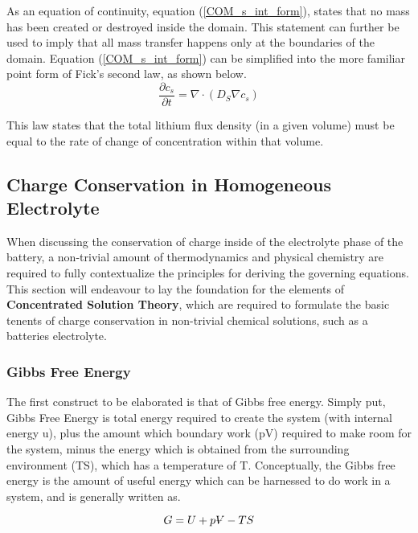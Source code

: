\documentclass[lettersize,journal]{IEEEtran}
\newcommand{\volume}{{\ooalign{\hfil$V$\hfil\cr\kern0.08em--\hfil\cr}}}
\begin{document}
 As an equation of continuity, equation (\ref{COM_s_int_form}), states that no mass has been created or destroyed inside the domain. This statement can further be used to imply that all mass transfer happens only at the boundaries of the domain. Equation (\ref{COM_s_int_form}) can be simplified into the more familiar point form of Fick's second law, as shown below.
\begin{equation}
    \frac{\partial c_{s}}{\partial t} = \nabla \cdot \left( D_{S} \nabla c_{s} \right)
\end{equation}

This law states that the total lithium flux density (in a given volume) must be equal to the rate of change of concentration within that volume.


\subsection{Charge Conservation in Homogeneous Electrolyte}

When discussing the conservation of charge inside of the electrolyte phase of the battery, a non-trivial amount of thermodynamics and physical chemistry are required to fully contextualize the principles for deriving the governing equations. \\

This section will endeavour to lay the foundation for the elements of \textbf{Concentrated Solution Theory}, which are required to formulate the basic tenents of charge conservation in non-trivial chemical solutions, such as a batteries electrolyte. \\

\subsubsection{Gibbs Free Energy}
The first construct to be elaborated is that of Gibbs free energy. Simply put, Gibbs Free Energy is total energy required to create the system (with internal energy u), plus the amount which boundary work (pV) required to make room for the system, minus the energy which is obtained from the surrounding environment (TS), which has a temperature of T. Conceptually, the Gibbs free energy is the amount of useful energy which can be harnessed to do work in a system, and is generally written as.

\begin{equation} \label{gibbs_free_energy}
  G = U + p{\volume} - TS
\end{equation}
\end{document}
